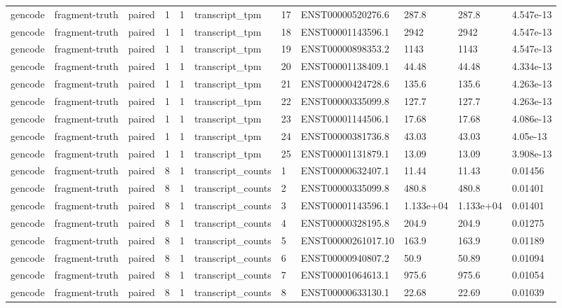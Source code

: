 \begin{tabular}{lllllllllll}
gencode & fragment-truth & paired & 1 & 1 & transcript\_tpm & 17 & ENST00000520276.6 & 287.8 & 287.8 & 4.547e-13 \\
gencode & fragment-truth & paired & 1 & 1 & transcript\_tpm & 18 & ENST00001143596.1 & 2942 & 2942 & 4.547e-13 \\
gencode & fragment-truth & paired & 1 & 1 & transcript\_tpm & 19 & ENST00000898353.2 & 1143 & 1143 & 4.547e-13 \\
gencode & fragment-truth & paired & 1 & 1 & transcript\_tpm & 20 & ENST00001138409.1 & 44.48 & 44.48 & 4.334e-13 \\
gencode & fragment-truth & paired & 1 & 1 & transcript\_tpm & 21 & ENST00000424728.6 & 135.6 & 135.6 & 4.263e-13 \\
gencode & fragment-truth & paired & 1 & 1 & transcript\_tpm & 22 & ENST00000335099.8 & 127.7 & 127.7 & 4.263e-13 \\
gencode & fragment-truth & paired & 1 & 1 & transcript\_tpm & 23 & ENST00001144506.1 & 17.68 & 17.68 & 4.086e-13 \\
gencode & fragment-truth & paired & 1 & 1 & transcript\_tpm & 24 & ENST00000381736.8 & 43.03 & 43.03 & 4.05e-13 \\
gencode & fragment-truth & paired & 1 & 1 & transcript\_tpm & 25 & ENST00001131879.1 & 13.09 & 13.09 & 3.908e-13 \\
gencode & fragment-truth & paired & 8 & 1 & transcript\_counts & 1 & ENST00000632407.1 & 11.44 & 11.43 & 0.01456 \\
gencode & fragment-truth & paired & 8 & 1 & transcript\_counts & 2 & ENST00000335099.8 & 480.8 & 480.8 & 0.01401 \\
gencode & fragment-truth & paired & 8 & 1 & transcript\_counts & 3 & ENST00001143596.1 & 1.133e+04 & 1.133e+04 & 0.01401 \\
gencode & fragment-truth & paired & 8 & 1 & transcript\_counts & 4 & ENST00000328195.8 & 204.9 & 204.9 & 0.01275 \\
gencode & fragment-truth & paired & 8 & 1 & transcript\_counts & 5 & ENST00000261017.10 & 163.9 & 163.9 & 0.01189 \\
gencode & fragment-truth & paired & 8 & 1 & transcript\_counts & 6 & ENST00000940807.2 & 50.9 & 50.89 & 0.01094 \\
gencode & fragment-truth & paired & 8 & 1 & transcript\_counts & 7 & ENST00001064613.1 & 975.6 & 975.6 & 0.01054 \\
gencode & fragment-truth & paired & 8 & 1 & transcript\_counts & 8 & ENST00000633130.1 & 22.68 & 22.69 & 0.01039 \\

\end{tabular}
